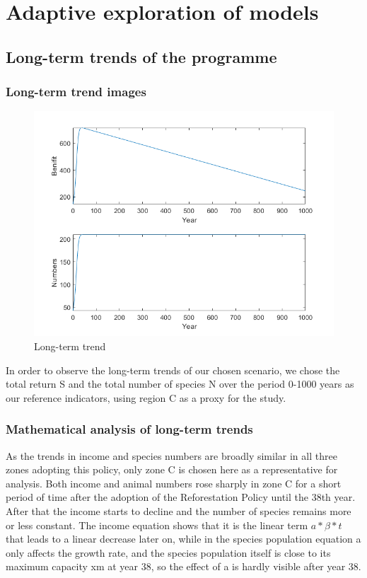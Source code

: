 \documentclass{mcmthesis}
\numberwithin{figure}{section}
\numberwithin{table}{section}
\numberwithin{equation}{section}
\begin{document}
\section{Adaptive exploration of models}
\subsection{Long-term trends of the programme}
\subsubsection{Long-term trend images}

\begin{figure}
	\centering
	\includegraphics[width=0.5\linewidth]{./figures/Q3_1C.png}
	\caption{Long-term trend}
	\label{F 7.1}
\end{figure}



In order to observe the long-term trends of our chosen scenario, we chose the total return S and the total number of species N over the period 0-1000 years as our reference indicators, using region C as a proxy for the study.

\subsubsection{Mathematical analysis of long-term trends}
As the trends in income and species numbers are broadly similar in all three zones adopting this policy, only zone C is chosen here as a representative for analysis. Both income and animal numbers rose sharply in zone C for a short period of time after the adoption of the Reforestation Policy until the 38th year. After that the income starts to decline and the number of species remains more or less constant. The income equation shows that it is the linear term $a*\beta*t$ that leads to a linear decrease later on, while in the species population equation a only affects the growth rate, and the species population itself is close to its maximum capacity xm at year 38, so the effect of a is hardly visible after year 38.
\end{document}
